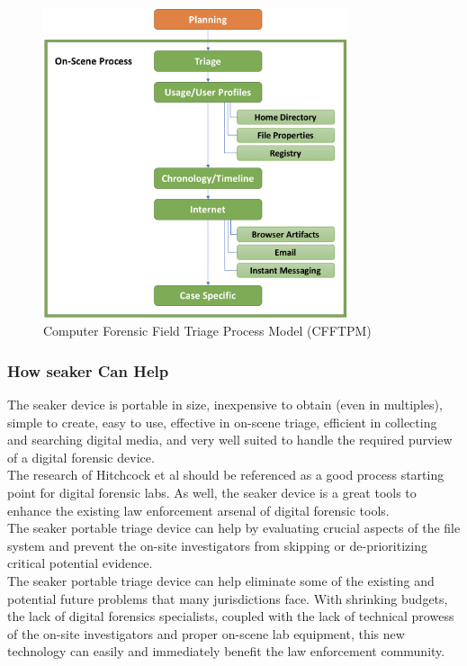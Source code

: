 \documentclass[12pt]{article}
\begin{document}
\begin{figure}[ht]
  \centering
    \includegraphics[width=0.8\textwidth]{images/CFFTPM.png}
  \caption{Computer Forensic Field Triage Process Model (CFFTPM)}
\end{figure}

\subsubsection{How \gls{seaker} Can Help}

The \gls{seaker} device is portable in size, inexpensive to obtain (even in multiples),
simple to create, easy to use, effective in on-scene triage, efficient in collecting and
searching digital media, and very well suited to handle the required purview of a digital
forensic device.\\

The research of Hitchcock et al\cite{hitchcock2016tiered} should be referenced as a good
process starting point for digital forensic labs.  As well, the \gls{seaker} device is a 
great tools to enhance the existing law enforcement arsenal of digital forensic tools.\\

The \gls{seaker} portable triage device can help by evaluating crucial
aspects of the file system and prevent the on-site investigators from skipping or
de-prioritizing critical potential evidence\cite{rogers2006computer}.\\

The \gls{seaker} portable triage device can help eliminate some of the existing and
potential future problems that many jurisdictions face.  With shrinking budgets,
the lack of digital forensics specialists, coupled with the lack of technical prowess
of the on-site investigators and proper on-scene lab equipment\cite{rogers2006computer},
this new technology can easily and immediately benefit the law enforcement community.\\
\end{document}
